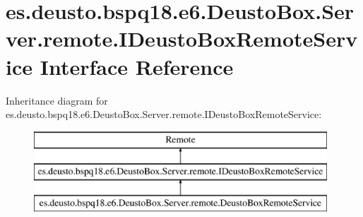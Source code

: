 \hypertarget{interfacees_1_1deusto_1_1bspq18_1_1e6_1_1_deusto_box_1_1_server_1_1remote_1_1_i_deusto_box_remote_service}{}\section{es.\+deusto.\+bspq18.\+e6.\+Deusto\+Box.\+Server.\+remote.\+I\+Deusto\+Box\+Remote\+Service Interface Reference}
\label{interfacees_1_1deusto_1_1bspq18_1_1e6_1_1_deusto_box_1_1_server_1_1remote_1_1_i_deusto_box_remote_service}
Inheritance diagram for es.\+deusto.\+bspq18.\+e6.\+Deusto\+Box.\+Server.\+remote.\+I\+Deusto\+Box\+Remote\+Service\+:\begin{figure}[H]
\begin{center}
\leavevmode
\includegraphics[height=3.000000cm]{interfacees_1_1deusto_1_1bspq18_1_1e6_1_1_deusto_box_1_1_server_1_1remote_1_1_i_deusto_box_remote_service}
\end{center}
\end{figure}
